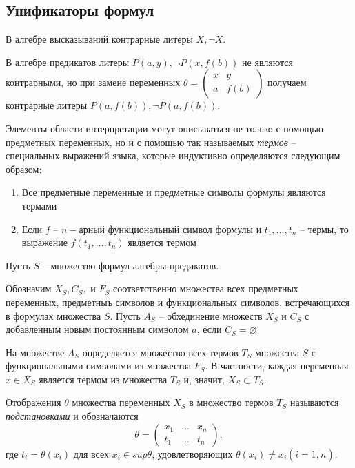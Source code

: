 \subsection*{Унификаторы формул}
\begin{example}
    В алгебре высказываний контрарные литеры $X, \lnot X$.

    В алгебре предикатов литеры $P(a,y),\lnot P(x,f(b))$ не являются контрарными, но при замене переменных 
    $\theta = \begin{pmatrix} x & y \\ a & f(b)\end{pmatrix}$
    получаем контрарные литеры $P(a,f(b)), \lnot P(a,f(b))$.
\end{example}

\begin{definition}
    Элементы области интерпретации могут описываться не только с помощью предметных переменных, но и с помощью так называемых \textit{термов} -- специальных выражений языка, которые индуктивно определяются следующим образом:
    \begin{enumerate}
        \item Все предметные переменные и предметные символы формулы являются термами
        \item Если $f$ -- $n-$арный функциональный символ формулы и $t_1,\ldots,t_n$ -- термы, то выражение $f(t_1,\ldots,t_n)$ является термом
    \end{enumerate}
\end{definition}

Пусть $S$ -- множество формул алгебры предикатов.

Обозначим $X_S,C_S,$ и $F_S$ соответственно множества всех предметных переменных, предметныъ символов и функциональных символов, встречающихся в формулах множества $S$. Пусть $A_S$ -- обхединение множеств $X_S$ и $C_S$ с добавленным новым постоянным символом $a$, если $C_S = \varnothing$.

На множестве $A_S$ определяется множество всех термов $T_S$ множества $S$ с функциональными символами из множества $F_S$. В частности, каждая переменная $x \in X_S$  является термом из множества $T_S$ и, значит, $X_S \subset T_S$.

\begin{definition}
    Отображения $\theta$ множества переменных $X_S$ в множество термов $T_S$ называются \textit{подстановками} и обозначаются 
    \begin{equation*}
        \theta = 
        \begin{pmatrix} 
            x_1 & \ldots & x_n \\ 
            t_1 & \ldots & t_n 
        \end{pmatrix},
    \end{equation*}
    где $t_i=\theta(x_i)$ для всех $x_i \in sup \theta$, удовлетворяющих $\theta(x_i)\neq x_i (i=\overline{1,n})$.
\end{definition}

